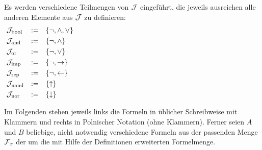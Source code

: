 
Es werden verschiedene Teilmengen von $\mathcal{J}$ eingeführt, die jeweils ausreichen alle anderen Elemente aus $\mathcal{J}$ zu definieren:
\begin{align}
& \mathcal{J}_{\mathrm{bool}} &:= & & & \{ \lnot, \land, \lor \} \label{def:Jbool}\\
& \mathcal{J}_{\mathrm{and}}  &:= & & & \{ \lnot, \land       \} \label{def:Jand} \\
& \mathcal{J}_{\mathrm{or}}   &:= & & & \{ \lnot, \lor        \} \label{def:Jor}  \\
& \mathcal{J}_{\mathrm{imp}}  &:= & & & \{ \lnot, \rightarrow       \} \label{def:Jimp} \\
& \mathcal{J}_{\mathrm{rep}}  &:= & & & \{ \lnot, \leftarrow       \} \label{def:Jrep} \\
& \mathcal{J}_{\mathrm{nand}} &:= & & & \{ \uparrow             \} \label{def:Jnand}\\
& \mathcal{J}_{\mathrm{nor}}  &:= & & & \{ \downarrow              \} \label{def:Jnor}
&&&&&&&&&&&&&&&&&&&&&&&&&&&&&&&&&&&&&&&&&&&&&&&&&&
\end{align}

Im Folgenden stehen jeweils links die Formeln in üblicher Schreibweise mit Klammern und rechts in Polnischer Notation (ohne Klammern).
Ferner seien $A$ und $B$ beliebige, nicht notwendig verschiedene Formeln aus der passenden Menge $\mathcal{F}_x$ \textbzw der um die mit Hilfe der Definitionen erweiterten Formelmenge.

